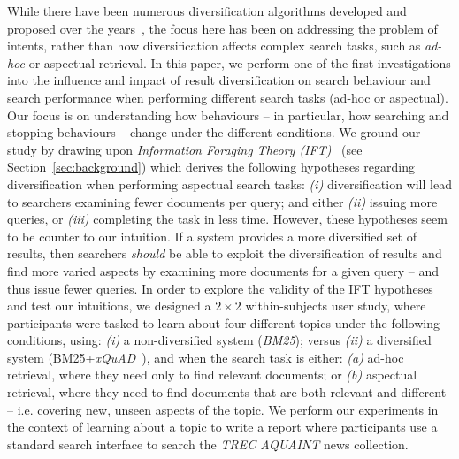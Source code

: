 While there have been numerous diversification algorithms developed and proposed over the years~\cite{carbonell1998mmr,chen2006lessismore,santos2010query_reformulations_diversification,santos2011intent,zhai2015subtopics}, the focus here has been on addressing the problem of intents, rather than how diversification affects complex search tasks, such as \emph{ad-hoc} or aspectual retrieval. In this paper, we perform one of the first investigations into the influence and impact of result diversification on search behaviour and search performance when performing different search tasks (ad-hoc or aspectual). Our focus is on understanding how behaviours -- in particular, how searching and stopping behaviours -- change under the different conditions. We ground our study by drawing upon \emph{Information Foraging Theory (IFT)}~\cite{pirolli1999ift} (see Section~\ref{sec:background}) which derives the following hypotheses regarding diversification when performing aspectual search tasks: \emph{(i)} diversification will lead to searchers examining fewer documents per query; and either \emph{(ii)} issuing more queries, or \emph{(iii)} completing the task in less time. However, these hypotheses seem to be counter to our intuition. If a system provides a more diversified set of results, then searchers \emph{should} be able to exploit the diversification of results and find more varied aspects by examining more documents for a given query -- and thus issue fewer queries. In order to explore the validity of the IFT hypotheses and test our intuitions, we designed a $2 \times 2$ within-subjects user study, where participants were tasked to learn about four different topics under the following conditions, using: \emph{(i)} a non-diversified system (\emph{BM25}); versus \emph{(ii)} a diversified system (BM25+\emph{xQuAD}~\cite{santos2010query_reformulations_diversification}), and when the search task is either: \emph{(a)} ad-hoc retrieval, where they need only to find relevant documents; or \emph{(b)} aspectual retrieval, where they need to find documents that are both relevant and different -- i.e. covering new, unseen aspects of the topic. We perform our experiments in the context of learning about a topic to write a report where participants use a standard search interface to search the \emph{TREC AQUAINT} news collection. 

